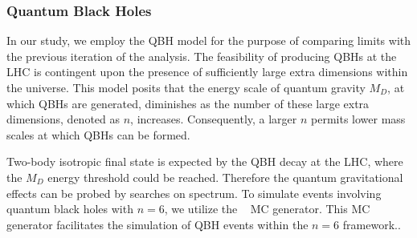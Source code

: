 \subsubsection{Quantum Black Holes}
In our study, we employ the QBH model for the purpose of comparing limits with the previous iteration of the analysis. The feasibility of producing QBHs at the LHC is contingent upon the presence of sufficiently large extra dimensions within the universe. This model posits that the energy scale of quantum gravity $M_{D}$, at which QBHs are generated, diminishes as the number of these large extra dimensions, denoted as $n$, increases. Consequently, a larger $n$ permits lower mass scales at which QBHs can be formed.

Two-body isotropic final state is expected by the QBH decay at the LHC, where the $M_D$ energy threshold could be reached. Therefore the quantum gravitational effects can be probed by searches on \mjj spectrum. To simulate events involving quantum black holes with $n=6$, we utilize the \BlackMax~\cite{Dai:2007ki} MC generator. This MC generator facilitates the simulation of QBH events within the $n=6$ framework..



